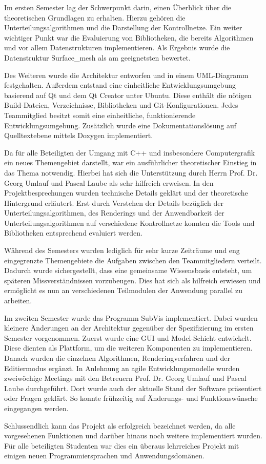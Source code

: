 Im ersten Semester lag der Schwerpunkt darin, einen Überblick über die theoretischen Grundlagen zu erhalten. 
Hierzu gehören die Unterteilungsalgorithmen und die Darstellung der Kontrollnetze.
Ein weiter wichtiger Punkt war die Evaluierung von Bibliotheken, die bereits Algorithmen und vor allem Datenstrukturen implementieren. 
Als Ergebnis wurde die Datenstruktur Surface\_mesh als am geeignetsten bewertet.

Des Weiteren wurde die Architektur entworfen und in einem UML-Diagramm festgehalten.
Außerdem entstand eine einheitliche Entwicklungsumgebung basierend auf Qt und dem Qt Creator unter Ubuntu.
Diese enthält die nötigen Build-Dateien, Verzeichnisse, Bibliotheken und Git-Konfigurationen.
Jedes Teammitglied besitzt somit eine einheitliche, funktionierende Entwicklungsumgebung.
Zusätzlich wurde eine Dokumentationslösung auf Quelltextebene mittels Doxygen implementiert.

Da für alle Beteiligten der Umgang mit C++ und insbesondere Computergrafik ein neues Themengebiet darstellt, war ein ausführlicher theoretischer Einstieg in das Thema notwendig. 
Hierbei hat sich die Unterstützung durch Herrn Prof. Dr. Georg Umlauf und Pascal Laube als sehr hilfreich erweisen.
In den Projektbesprechungen wurden technische Details geklärt und der theoretische Hintergrund erläutert.
Erst durch Verstehen der Details bezüglich der Unterteilungsalgorithmen, des Renderings und der Anwendbarkeit der Unterteilungsalgorithmen auf verschiedene Kontrollnetze konnten die Tools und Bibliotheken entsprechend evaluiert werden.

Während des Semesters wurden lediglich für sehr kurze Zeiträume und eng eingegrenzte Themengebiete die Aufgaben zwischen den Teammitgliedern verteilt.
Dadurch wurde sichergestellt, dass eine gemeinsame Wissensbasis entsteht, um späteren Missverständnissen vorzubeugen.
Dies hat sich als hilfreich erwiesen und ermöglicht es nun an verschiedenen Teilmodulen der Anwendung parallel zu arbeiten.

Im zweiten Semester wurde das Programm SubVis implementiert. 
Dabei wurden kleinere Änderungen an der Architektur gegenüber der Spezifizierung im ersten Semester vorgenommen.
Zuerst wurde eine GUI und Model-Schicht entwickelt. 
Diese dienten als Plattform, um die weiteren Komponenten zu implementieren.
Danach wurden die einzelnen Algorithmen, Renderingverfahren und der Editiermodus ergänzt.
In Anlehnung an agile Entwicklungsmodelle wurden zweiwöchige Meetings mit den Betreuern Prof. Dr. Georg Umlauf und Pascal Laube durchgeführt. 
Dort wurde auch der aktuelle Stand der Software präsentiert oder Fragen geklärt.
So konnte frühzeitig auf Änderungs- und Funktionswünsche eingegangen werden.

Schlussendlich kann das Projekt als erfolgreich bezeichnet werden, da alle vorgesehenen Funktionen und darüber hinaus noch weitere implementiert wurden.
Für alle beteiligten Studenten war dies ein überaus lehrreiches Projekt mit einigen neuen Programmiersprachen und Anwendungsdomänen.





